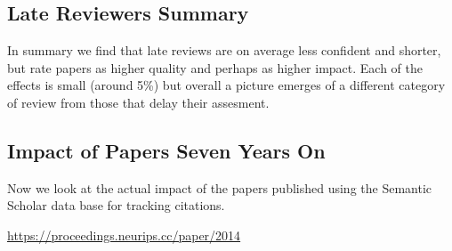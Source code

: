 \hypertarget{late-reviewers-summary}{%
\subsection{Late Reviewers Summary}\label{late-reviewers-summary}}

In summary we find that late reviews are on average less confident and
shorter, but rate papers as higher quality and perhaps as higher impact.
Each of the effects is small (around 5\%) but overall a picture emerges
of a different category of review from those that delay their assesment.

\hypertarget{impact-of-papers-seven-years-on}{%
\subsection{Impact of Papers Seven Years
On}\label{impact-of-papers-seven-years-on}}

\begin{flushright}
\end{flushright}

Now we look at the actual impact of the papers published using the
Semantic Scholar data base for tracking citations.

\begin{Shaded}
\begin{Highlighting}[]
\end{Highlighting}
\end{Shaded}

\begin{Shaded}
\begin{Highlighting}[]
\end{Highlighting}
\end{Shaded}

\begin{Shaded}
\begin{Highlighting}[]
\OperatorTok{=}
\end{Highlighting}
\end{Shaded}

\url{https://proceedings.neurips.cc/paper/2014}

